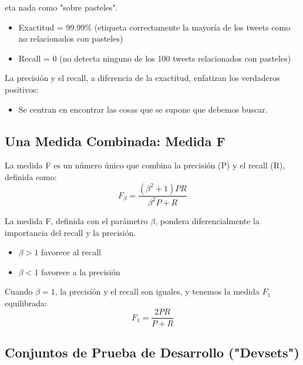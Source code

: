 eta nada como "sobre pasteles".

\begin{itemize}
  \item Exactitud = 99.99\% (etiqueta correctamente la mayoría de los tweets como no relacionados con pasteles)
  \item Recall = 0 (no detecta ninguno de los 100 tweets relacionados con pasteles)
\end{itemize}

La precisión y el recall, a diferencia de la exactitud, enfatizan los verdaderos positivos:
\begin{itemize}
  \item Se centran en encontrar las cosas que se supone que debemos buscar.
\end{itemize}

\subsection{Una Medida Combinada: Medida F}
La medida F es un número único que combina la precisión (P) y el recall (R), definida como:
\[
F_\beta = \frac{(\beta^2+1)PR}{\beta^2P + R}
\]

La medida F, definida con el parámetro $\beta$, pondera diferencialmente la importancia del recall y la precisión.
\begin{itemize}
  \item $\beta > 1$ favorece al recall
  \item $\beta < 1$ favorece a la precisión
\end{itemize}

Cuando $\beta = 1$, la precisión y el recall son iguales, y tenemos la medida $F_1$ equilibrada:
\[
F_1 = \frac{2PR}{P + R}
\]

\subsection{Conjuntos de Prueba de Desarrollo ("Devsets")}

